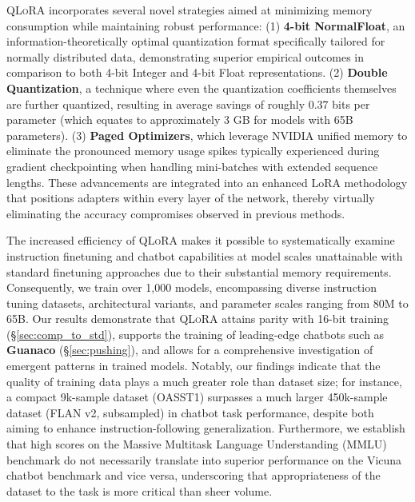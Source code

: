 \textsc{QLoRA} incorporates several novel strategies aimed at minimizing memory consumption while maintaining robust performance: (1) \textbf{4-bit NormalFloat}, an information-theoretically optimal quantization format specifically tailored for normally distributed data, demonstrating superior empirical outcomes in comparison to both 4-bit Integer and 4-bit Float representations. (2) \textbf{Double Quantization}, a technique where even the quantization coefficients themselves are further quantized, resulting in average savings of roughly 0.37 bits per parameter (which equates to approximately 3 GB for models with 65B parameters). (3) \textbf{Paged Optimizers}, which leverage NVIDIA unified memory to eliminate the pronounced memory usage spikes typically experienced during gradient checkpointing when handling mini-batches with extended sequence lengths. These advancements are integrated into an enhanced LoRA methodology that positions adapters within every layer of the network, thereby virtually eliminating the accuracy compromises observed in previous methods.

The increased efficiency of \textsc{QLoRA} makes it possible to systematically examine instruction finetuning and chatbot capabilities at model scales unattainable with standard finetuning approaches due to their substantial memory requirements. Consequently, we train over 1,000 models, encompassing diverse instruction tuning datasets, architectural variants, and parameter scales ranging from 80M to 65B. Our results demonstrate that \textsc{QLoRA} attains parity with 16-bit training (\S\ref{sec:comp_to_std}), supports the training of leading-edge chatbots such as \textbf{Guanaco} (\S\ref{sec:pushing}), and allows for a comprehensive investigation of emergent patterns in trained models. Notably, our findings indicate that the quality of training data plays a much greater role than dataset size; for instance, a compact 9k-sample dataset (OASST1) surpasses a much larger 450k-sample dataset (FLAN v2, subsampled) in chatbot task performance, despite both aiming to enhance instruction-following generalization. Furthermore, we establish that high scores on the Massive Multitask Language Understanding (MMLU) benchmark do not necessarily translate into superior performance on the Vicuna chatbot benchmark and vice versa, underscoring that appropriateness of the dataset to the task is more critical than sheer volume.

